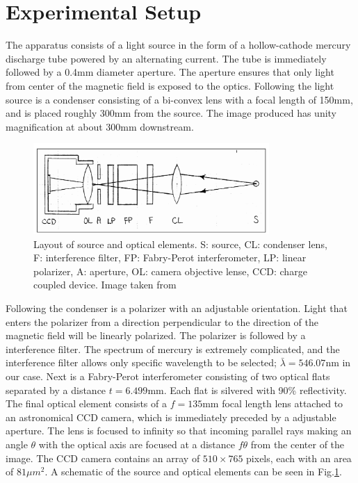 \documentclass[12pt]{article}
\begin{document}
\section{Experimental Setup}
The apparatus consists of a light source in the form of a hollow-cathode mercury discharge tube powered by an alternating current. The tube is immediately followed by a 0.4mm diameter aperture. The aperture ensures that only light from center of the magnetic field is exposed to the optics. Following the light source is a condenser consisting of a bi-convex lens with a focal length of 150mm, and is placed roughly 300mm from the source. The image produced has unity magnification at about 300mm downstream.
\begin{figure}[h!]\centering
 \quad \includegraphics[width=0.8\textwidth]{optical}
\caption{Layout of source and optical elements. S: source, CL: condenser lens, F: interference filter, FP: Fabry-Perot interferometer, LP: linear polarizer, A: aperture, OL: camera objective lense, CCD: charge coupled device. Image taken from \cite{manual}}
\label{fig:optical}
\end{figure}
Following the condenser is a polarizer with an adjustable orientation. Light that enters the polarizer from a direction perpendicular to the direction of the magnetic field will be linearly polarized.  The polarizer is followed by a interference filter. The spectrum of mercury is extremely complicated, and the interference filter allows only specific wavelength to be selected; $\bar{\lambda} = 546.07$nm in our case. Next is a Fabry-Perot interferometer consisting of two optical flats separated by a distance $t = 6.499$mm. Each flat is silvered with 90\% reflectivity. The final optical element consists of a $f = 135$mm focal length lens attached to an astronomical CCD camera, which is immediately preceded by a adjustable aperture. The lens is focused to infinity so that incoming parallel rays making an angle $\theta$ with the optical axis are focused at a distance $f\theta$ from the center of the image. The CCD camera contains an array of $510\times 765$ pixels, each with an area of $81\mu m^2$. A schematic of the source and optical elements can be seen in Fig.\ref{fig:optical}.\\
\end{document}

